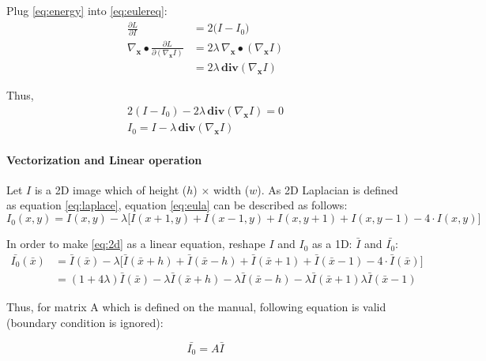 \documentclass[paper=a4, fontsize=11pt]{scrartcl} %
\numberwithin{equation}{section} %
\numberwithin{figure}{section} %
\numberwithin{table}{section} %
\renewcommand{\vec}[1]{\mathbf{#1}}
\begin{document}
Plug \ref{eq:energy} into \ref{eq:eulereq}: 
\begin{align}
	\frac{\partial L}{\partial I} &= 2 \big(I - I_0) \\
	\nabla_{\vec{x}} \bullet \frac{\partial L}{\partial (\nabla_{\vec{x}} I)} &= 2 \lambda \, \nabla_{\vec{x}} \bullet (\nabla_{\vec{x}} I) \\ 
	&= 2 \lambda \, \textbf{div}(\nabla_{\vec{x}} I)
\end{align}

Thus,
\begin{gather}
	2(I - I_0) - 2 \lambda \, \textbf{div} (\nabla_{\vec{x}} I) = 0 \\
	I_0 = I - \lambda \, \textbf{div} (\nabla_{\vec{x}} I) \label{eq:eula}
\end{gather}

\paragraph{Vectorization and Linear operation}

Let $I$ is a 2D image which of height ($h$) $\times$ width ($w$). As 2D Laplacian is defined as equation \ref{eq:laplace}, equation \ref{eq:eula} can be described as follows:
\begin{equation}
	I_0(x, y) = I(x, y) - \lambda \big[ I(x + 1, y) + I(x - 1, y) + I(x, y + 1) + I(x, y - 1) - 4 \cdot I(x, y) \big] \label{eq:2d}
\end{equation}

In order to make \ref{eq:2d} as a linear equation, reshape $I$ and $I_0$ as a 1D: $\bar{I}$ and $\bar{I_0}$:
\begin{align}
	\bar{I_0}(\bar{x}) &= \bar{I}(\bar{x}) - \lambda \big[ \bar{I}(\bar{x} + h) + \bar{I}(\bar{x} - h) + \bar{I}(\bar{x} + 1) + \bar{I}(\bar{x} - 1) - 4 \cdot \bar{I}(\bar{x}) \big] \\
	&= (1 + 4 \lambda) \bar{I}(\bar{x}) - \lambda \bar{I}(\bar{x} + h) - \lambda \bar{I}(\bar{x} - h) - \lambda \bar{I}(\bar{x} + 1) \lambda \bar{I}(\bar{x} - 1)
\end{align}

Thus, for matrix A which is defined on the manual, following equation is valid (boundary condition is ignored):

\begin{equation}
	\bar{I_0} = A \bar{I}
\end{equation}

\end{document}
